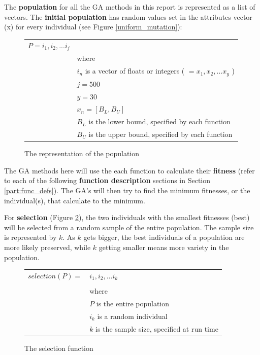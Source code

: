 \documentclass[12pt]{article}
\begin{document}
The \textbf{population} for all the GA methods in this report is represented as a list of vectors. The \textbf{initial population} has random values set in the attributes vector (x) for every individual (see Figure \ref{uniform_mutation}):
\begin{figure}[!h]
        \begin{center}
		\begin{tabular}{r l}
	                $ P = i_1, i_2, ... i_j $	& \\
								& where \\
								& $ i_n $ is a vector of floats or integers ( $ = x_1, x_2, ... x_y $ ) \\
								& $ j = 500 $ \\
								& $ y = 30 $ \\
								& $ x_n = [B_L, B_U] $ \\
								& $ B_L $ is the lower bound, specified by each function\\
								& $ B_U $ is the upper bound, specified by each function\\
		\end{tabular} 
               \caption{The representation of the population}
                \label{population}
        \end{center}
\end{figure}

The GA methods here will use the each function to calculate their \textbf{fitness} (refer to each of the following \textbf{function description} sections in Section \ref{part:func_defs}). The GA's will then try to find the minimum fitnesses, or the individual(s), that calculate to the minimum.

For \textbf{selection} (Figure \ref{selection}), the two individuals with the smallest fitnesses (best) will be selected from a random sample of the entire population. The sample size is represented by $ k $. As $ k $ gets bigger, the best individuals of a population are more likely preserved, while $ k $ getting smaller means more variety in the population. 
\begin{figure}[!h]
        \begin{center}
		\begin{tabular}{r l}
			$ selection(P) = $		&	$ i_1, i_2, ... i_k$ \\
								& \\
								&	where \\
								&	$ P $ is the entire population \\
								&	$ i_k $ is a random individual \\
								&	$ k $ is the sample size, specified at run time \\
		\end{tabular} 
               \caption{The selection function}
                \label{selection}
        \end{center}
\end{figure}
\end{document}
